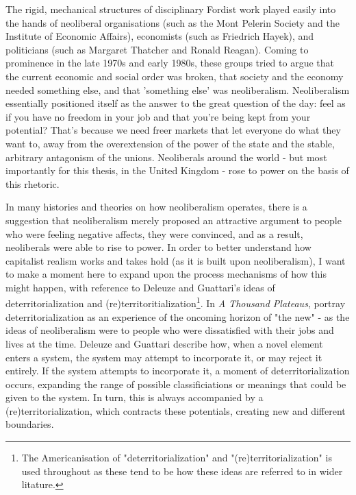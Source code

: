 The rigid, mechanical structures of disciplinary Fordist work played easily into the hands of neoliberal organisations (such as the Mont Pelerin Society and the Institute of Economic Affairs), economists (such as Friedrich Hayek), and politicians (such as Margaret Thatcher and Ronald Reagan). Coming to prominence in the late 1970s and early 1980s, these groups tried to argue that the current economic and social order was broken, that society and the economy needed something else, and that 'something else' was neoliberalism. Neoliberalism essentially positioned itself as the answer to the great question of the day: feel as if you have no freedom in your job and that you're being kept from your potential? That's because we need freer markets that let everyone do what they want to, away from the overextension of the power of the state and the stable, arbitrary antagonism of the unions. Neoliberals around the world - but most importantly for this thesis, in the United Kingdom - rose to power on the basis of this rhetoric.

In many histories and theories on how neoliberalism operates, there is a suggestion that neoliberalism merely proposed an attractive argument to people who were feeling negative affects, they were convinced, and as a result, neoliberals were able to rise to power. In order to better understand how capitalist realism works and takes hold (as it is built upon neoliberalism), I want to make a moment here to  expand upon the process mechanisms of how this might happen,  with reference to Deleuze and Guattari's ideas of deterritorialization and (re)territoritialization\footnote{The Americanisation of "deterritorialization" and "(re)territorialization" is used throughout as these tend to be how these ideas are referred to in wider litature.}. In \emph{A Thousand Plateaus}, \citet{deleuze_thousand_1987} portray deterritorialization as an experience of the oncoming horizon of "the new" - as the ideas of neoliberalism were to people who were dissatisfied with their jobs and lives at the time. Deleuze and Guattari describe how, when a novel element enters a system, the system may attempt to incorporate it, or may reject it entirely. If the system attempts to incorporate it, a moment of deterritorialization occurs, expanding the range of possible classificiations or meanings that could be given to the system. In turn, this is always accompanied by a (re)territorialization, which contracts these potentials, creating new and different boundaries. 

